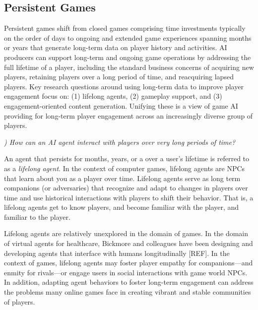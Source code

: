\documentclass[conference]{IEEEtran}
\newcounter{questionno}
\newcommand{\subsubsectionx}[1]{{\em {\arabic{questionno}) #1}}
	\addtocounter{questionno}{1}
	}
\begin{document}
\subsection{Persistent Games}

Persistent games shift from closed games comprising time investments typically on the order of days to ongoing and extended game experiences spanning months or years that generate long-term data on player history and activities. AI producers can support long-term and ongoing game operations by addressing the full lifetime of a player, including the standard business concerns of acquiring new players, retaining players over a long period of time, and reacquiring lapsed players. Key research questions around using long-term data to improve player engagement focus on: (1) lifelong agents, (2) gameplay support, and (3) engagement-oriented content generation. Unifying these is a view of game AI providing for long-term player engagement across an increasingly diverse group of players.

\subsubsectionx{How can an AI agent interact with players over very long periods of time?}
%
An agent that persists for months, years, or a over a user's lifetime is referred to as a {\em lifelong agent}. 
In the context of computer games, lifelong agents are NPCs that learn about you as a player over time. 
Lifelong agents serve as long term companions (or adversaries) that 
recognize and adapt to  
changes in players over time and use historical interactions with players to shift their behavior.
That is, a lifelong agents get to know players, and become familiar with the player, and familiar to the player.
%

Lifelong agents are relatively unexplored in the domain of games.
In the domain of virtual agents for healthcare, Bickmore and colleagues have been designing and developing agents that interface with humans longitudinally [REF]. 
In the context of games, lifelong agents may foster player empathy for companions---and enmity for rivals---or engage users in social interactions with game world NPCs. 
In addition, adapting agent behaviors to foster long-term engagement can address the problems many online games face in creating vibrant and stable communities of players.

\end{document}
